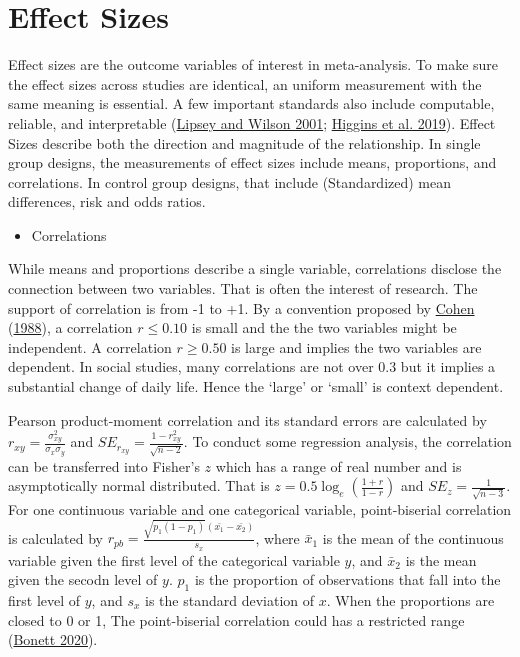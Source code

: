 \documentclass[
  11pt,
  openany]{memoir}
\providecommand{\tightlist}{%
  \setlength{\itemsep}{0pt}\setlength{\parskip}{0pt}}
\begin{document}
\hypertarget{effect-sizes}{%
\section{Effect Sizes}\label{effect-sizes}}

Effect sizes are the outcome variables of interest in meta-analysis.
To make sure the effect sizes across studies are identical, an uniform measurement with the same meaning is essential.
A few important standards also include computable, reliable, and interpretable (\protect\hyperlink{ref-lipseyPracticalMetaanalysis2001}{Lipsey and Wilson 2001}; \protect\hyperlink{ref-higginsCochraneHandbookSystematic2019}{Higgins et al. 2019}).
Effect Sizes describe both the direction and magnitude of the relationship.
In single group designs, the measurements of effect sizes include means, proportions, and correlations.
In control group designs, that include (Standardized) mean differences, risk and odds ratios.

\begin{itemize}
\tightlist
\item
  Correlations
\end{itemize}

While means and proportions describe a single variable, correlations disclose the connection between two variables.
That is often the interest of research.
The support of correlation is from -1 to +1.
By a convention proposed by \protect\hyperlink{ref-cohenStatisticalPowerAnalysis1988}{Cohen} (\protect\hyperlink{ref-cohenStatisticalPowerAnalysis1988}{1988}), a correlation \(r\le 0.10\) is small and the the two variables might be independent.
A correlation \(r\ge 0.50\) is large and implies the two variables are dependent.
In social studies, many correlations are not over \(0.3\) but it implies a substantial change of daily life.
Hence the `large' or `small' is context dependent.

Pearson product-moment correlation and its standard errors are calculated by \(r_{xy} = \frac{\sigma^{2}_{xy}}{\sigma_x \sigma_y}\) and \(SE_{r_{xy}} = \frac{1-r_{xy}^2}{\sqrt{n-2}}\).
To conduct some regression analysis, the correlation can be transferred into Fisher's \(z\) which has a range of real number and is asymptotically normal distributed.
That is \(z = 0.5\log_{e}\left(\frac{1+r}{1-r}\right)\) and \(SE_{z} = \frac{1}{\sqrt{n-3}}\).
For one continuous variable and one categorical variable, point-biserial correlation is calculated by \({r_{pb}}= \frac{\sqrt{p_1(1-p_1)}(\bar{x_1}-\bar{x_2})}{s_x}\), where \(\bar x_1\) is the mean of the continuous variable given the first level of the categorical variable \(y\), and \(\bar x_2\) is the mean given the secodn level of \(y\).
\(p_1\) is the proportion of observations that fall into the first level of \(y\), and \(s_x\) is the standard deviation of \(x\).
When the proportions are closed to 0 or 1, The point-biserial correlation could has a restricted range (\protect\hyperlink{ref-bonettPointbiserialCorrelationInterval2020}{Bonett 2020}).
\end{document}
